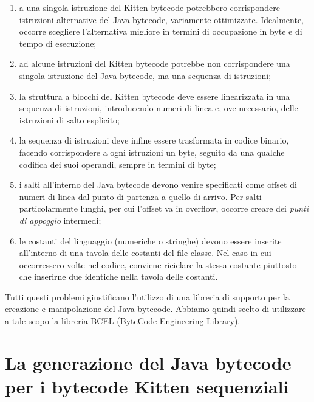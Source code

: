 \begin{enumerate}
\item a una singola istruzione del Kitten bytecode potrebbero corrispondere
      \piu istruzioni alternative del Java bytecode, variamente ottimizzate.
      Idealmente, occorre scegliere l'alternativa migliore in termini di
      occupazione in byte e di tempo di esecuzione;
\item ad alcune istruzioni del Kitten bytecode potrebbe non corrispondere
      una singola istruzione del Java bytecode, ma una sequenza di \piu
      istruzioni;
\item la struttura a blocchi del Kitten bytecode deve essere linearizzata in
      una sequenza di istruzioni, introducendo numeri di linea e,
      ove necessario, delle istruzioni di salto esplicito;
\item la sequenza di istruzioni deve infine essere trasformata in codice
      binario, facendo corrispondere a ogni istruzioni un byte, seguito da
      una qualche codifica dei suoi operandi, sempre in termini di byte;
\item i salti all'interno del Java bytecode devono venire specificati come offset
      di numeri di linea dal punto di partenza a quello di arrivo. Per
      salti particolarmente lunghi, per cui l'offset va in overflow,
      occorre creare dei \emph{punti di appoggio} intermedi;
\item le costanti del linguaggio (numeriche o stringhe) devono essere
      inserite all'interno di una tavola delle costanti del file classe.
      Nel caso in cui occorressero \piu volte nel codice, conviene
      riciclare la stessa costante piuttosto che inserirne due identiche
      nella tavola delle costanti.
\end{enumerate}
%
Tutti questi problemi giustificano l'utilizzo di una libreria di
supporto per la creazione e manipolazione del Java bytecode. Abbiamo
quindi scelto di utilizzare a tale scopo
la libreria BCEL (ByteCode Engineering Library).

\section{La generazione del Java bytecode per i bytecode Kitten sequenziali}

